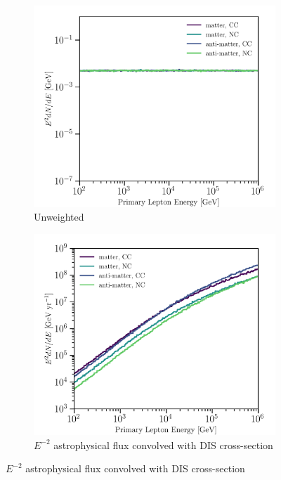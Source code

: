 \documentclass[main.tex]{subfiles}
\begin{document}
\begin{figure}[h]
 \centering
    \begin{subfigure}[b]{0.45\linewidth}
    	\centering
        \includegraphics[width=1.0\linewidth]{figures/totalE_unweighted.png}
        \caption{Unweighted}
    \end{subfigure}%
    \begin{subfigure}[b]{0.45\linewidth}
    	\centering
        \includegraphics[width=1.0\linewidth]{figures/totalE_weighted.png}
        \caption{$E^{-2}$ astrophysical flux convolved with DIS cross-section}

\end{subfigure}
\end{figure}
\end{document}
